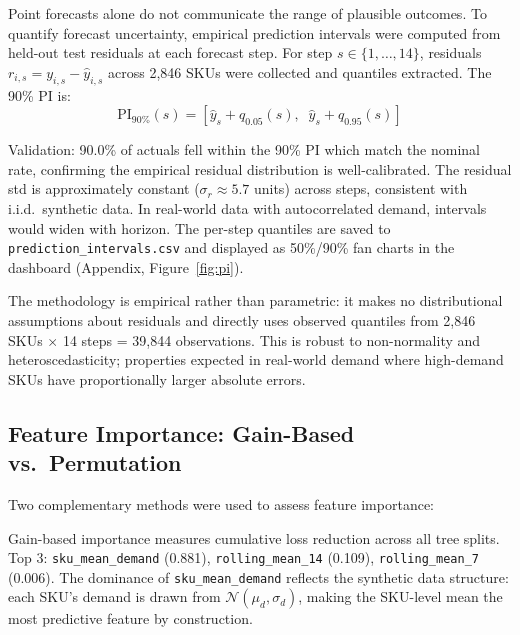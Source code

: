 \documentclass[11pt,letterpaper]{article}
\begin{document}
Point forecasts alone do not communicate the range of plausible outcomes. To quantify forecast uncertainty, empirical prediction intervals were computed from held-out test residuals at each forecast step. For step $s \in \{1, \ldots, 14\}$, residuals $r_{i,s} = y_{i,s} - \hat{y}_{i,s}$ across 2,846 SKUs were collected and quantiles extracted. The 90\% PI is:
\begin{equation}
    \text{PI}_{90\%}(s) = \left[\hat{y}_s + q_{0.05}(s),\;\; \hat{y}_s + q_{0.95}(s)\right]
\end{equation}

Validation: 90.0\% of actuals fell within the 90\% PI which match the nominal rate, confirming the empirical residual distribution is well-calibrated. The residual std is approximately constant ($\sigma_r \approx 5.7$ units) across steps, consistent with i.i.d.\ synthetic data. In real-world data with autocorrelated demand, intervals would widen with horizon. The per-step quantiles are saved to \texttt{prediction\_intervals.csv} and displayed as 50\%/90\% fan charts in the dashboard (Appendix, Figure~\ref{fig:pi}).

The methodology is empirical rather than parametric: it makes no distributional assumptions about residuals and directly uses observed quantiles from 2,846 SKUs $\times$ 14 steps = 39,844 observations. This is robust to non-normality and heteroscedasticity; properties expected in real-world demand where high-demand SKUs have proportionally larger absolute errors.

\subsection{Feature Importance: Gain-Based vs.\ Permutation}
\label{sec:feature-importance}

Two complementary methods were used to assess feature importance:

Gain-based importance measures cumulative loss reduction across all tree splits. Top 3: \texttt{sku\_mean\_demand} (0.881), \texttt{rolling\_mean\_14} (0.109), \texttt{rolling\_mean\_7} (0.006). The dominance of \texttt{sku\_mean\_demand} reflects the synthetic data structure: each SKU's demand is drawn from $\mathcal{N}(\mu_d, \sigma_d)$, making the SKU-level mean the most predictive feature by construction.
\end{document}
